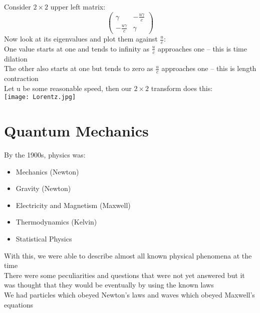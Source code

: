 \documentclass[a4paper, 11pt, fleqn, normalem]{report}
\begin{document}
Consider $2\times2$ upper left matrix:
\begin{equation*}
    \begin{pmatrix}
        \gamma             & -\frac{u\gamma}{c} \\
        -\frac{u\gamma}{c} & \gamma
    \end{pmatrix}
\end{equation*}
Now look at its eigenvalues and plot them against $\frac{u}{c}$: \\
One value starts at one and tends to infinity as $\frac{u}{c}$ approaches one -- this is time dilation \\
The other also starts at one but tends to zero as $\frac{u}{c}$ approaches one -- this is length contraction \\
Let u be some reasonable speed, then our $2\times2$ transform does this:\\
\texttt{[image: Lorentz.jpg]}

\chapter{Quantum Mechanics}
By the 1900s, physics was:
\begin{itemize}
    \item Mechanics (Newton)
    \item Gravity (Newton)
    \item Electricity and Magnetism (Maxwell)
    \item Thermodynamics (Kelvin)
    \item Statistical Physics
\end{itemize}
With this, we were able to describe almost all known physical phenomena at the time \\
There were some peculiarities and questions that were not yet answered but it was thought that they would be eventually by using the known laws\\
We had particles which obeyed Newton's laws and waves which obeyed Maxwell's equations
\end{document}
